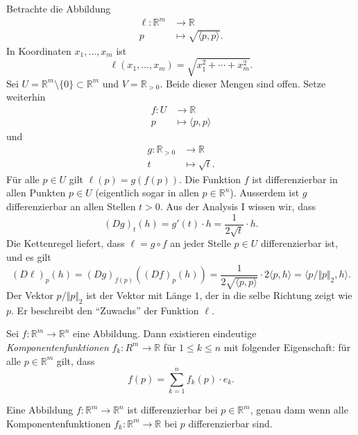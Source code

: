 \documentclass[../main.tex]{subfiles}
\begin{document}
\begin{example}
  Betrachte die Abbildung
  \begin{align*}
    \ell \colon \mathbb{R}^m & \to \mathbb{R} \\
    p & \mapsto \sqrt{\langle p, p \rangle}.
  \end{align*}
  In Koordinaten $x_1, \dots, x_m$ ist
   \[
     \ell(x_1, \dots, x_m) = \sqrt{x_1^2 + \cdots + x_m^2}.
  \]
  Sei $U = \mathbb{R}^m \setminus \{0\} \subset \mathbb{R}^m$
  und $V = \mathbb{R}_{>0}$.
  Beide dieser Mengen sind offen. Setze weiterhin
  \begin{align*}
    f \colon U & \to \mathbb{R} \\
    p & \mapsto \langle p, p \rangle
  \end{align*}
  und
  \begin{align*}
    g \colon \mathbb{R}_{>0} & \to \mathbb{R} \\
    t & \mapsto \sqrt t.
  \end{align*}
  Für alle $p \in U$ gilt $\ell(p) = g(f(p))$.
  Die Funktion $f$ ist differenzierbar in allen
  Punkten $p \in U$
  (eigentlich sogar in allen $p \in \mathbb{R}^n$).
  Ausserdem ist $g$ differenzierbar an allen Stellen
  $t > 0$.
  Aus der Analysis I wissen wir, dass
  \[
    {(Dg)}_t(h) = g'(t) \cdot h = \frac{1}{2 \sqrt t} \cdot h.
  \]
  Die Kettenregel liefert, dass
  $\ell = g \circ f$ an jeder Stelle $p \in U$ differenzierbar ist,
  und es gilt
  \[
    {(D \ell)}_p(h) = {(Dg)}_{f(p)}({(Df)}_p(h))
    = \frac{1}{2 \sqrt{\langle p, p \rangle}} \cdot 2 \langle p, h \rangle
    = \langle p / \Vert p \Vert_2, h \rangle.
  \]
  Der Vektor $p / \Vert p \Vert_2$ ist der Vektor mit Länge $1$,
  der in die selbe Richtung zeigt wie $p$.
  Er beschreibt den ``Zuwachs'' der Funktion $\ell$.
\end{example}

\begin{definition}
  Sei $f \colon \mathbb{R}^m \to \mathbb{R}^n$ eine Abbildung.
  Dann existieren eindeutige \emph{Komponentenfunktionen}
  $f_k \colon R^m \to \mathbb{R}$
  für $1 \leq k \leq n$ mit folgender Eigenschaft:
  für alle $p \in \mathbb{R}^m$ gilt, dass
  \[
    f(p) = \sum_{k=1}^{n} f_k(p) \cdot e_k.
  \]
\end{definition}

\begin{lemma*}
  Eine Abbildung $f \colon \mathbb{R}^m \to \mathbb{R}^n$ ist differenzierbar bei $p \in \mathbb{R}^m$,
  genau dann wenn alle Komponentenfunktionen
  $f_k \colon \mathbb{R}^m \to \mathbb{R}$ bei $p$ differenzierbar sind.
\end{lemma*}
\end{document}
